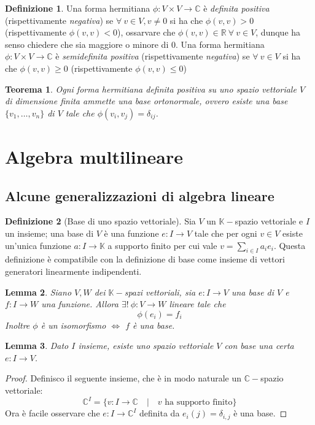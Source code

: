 \documentclass[11pt]{article}
\theoremstyle{plain}
\newtheorem{thm}{Teorema}[section]
\newtheorem{lemma}[thm]{Lemma}
\theoremstyle{definition}
\newtheorem{defn}{Definizione}[section]
\theoremstyle{remark}
\newcommand{\C}{\mathbb{C}}
\newcommand{\R}{\mathbb{R}}
\newcommand{\K}{\mathbb{K}}
\begin{document}
\begin{defn}
	Una forma hermitiana $\phi:V\times V\to \C$ è \textit{definita positiva} (rispettivamente \textit{negativa}) se $\forall\ v\in V, v\neq 0$ si ha che $\phi(v,v)>0$ (rispettivamente $\phi(v,v)<0$), ossarvare che $\phi(v,v)\in \R\ \forall\ v\in V$, dunque ha senso chiedere che sia maggiore o minore di $0$.\newline
	Una forma hermitiana $\phi:V\times V\to \C$ è \textit{semidefinita positiva} (rispettivamente \textit{negativa}) se $\forall\ v\in V$ si ha che $\phi(v,v)\geq 0$ (rispettivamente $\phi(v,v)\leq 0$)
\end{defn}

\begin{thm}
	Ogni forma hermitiana definita positiva su uno spazio vettoriale $V$ di dimensione finita ammette una \textit{base ortonormale}, ovvero esiste una base $\{v_1,\ldots,v_n\}$ di $V$ tale che $\phi(v_i,v_j)=\delta_{ij}$. 
\end{thm}




\newpage
\section{Algebra multilineare}
\subsection{Alcune generalizzazioni di algebra lineare}

\begin{defn}[Base di uno spazio vettoriale]
Sia $V$ un $\K-$spazio vettoriale e $I$ un insieme; una base di $V$ è una funzione $e: I \to V$ tale che 
per ogni $v \in V$ esiste un'unica funzione $a: I \to \K$ a supporto finito per cui vale $v=\sum_{i\in I}a_i e_i$.
Questa definizione è compatibile con la definizione di base come insieme di vettori generatori linearmente indipendenti.
\end{defn}


\begin{lemma}
Siano $V,W$ dei $\K-$spazi vettoriali, sia $e:I\to V$ una base di $V$ e $f: I \to W$ una funzione. Allora $\exists!\  \phi: V \to W$ lineare tale che
\[\phi(e_i) = f_i \]
Inoltre $\phi$ è un isomorfismo $\Leftrightarrow$ $f$ è una base.
\end{lemma}

\begin{lemma}
Dato $I$ insieme, esiste uno spazio vettoriale $V$ con base una certa $e:I\to V$.
\end{lemma}
\begin{proof}
Definisco il seguente insieme, che è in modo naturale un $\C-$spazio vettoriale:
\[ \C^I = \{ v:I\to\C \quad|\quad v \text{ ha supporto finito}\}\]
Ora è facile osservare che $e:I\to\C^I$ definita da $e_i(j) = \delta_{i,j}$ è una base.
\end{proof}
\end{document}
